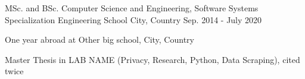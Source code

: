 


\begin{cventries}
	
	\cventry
	{MSc. and BSc. Computer Science and Engineering, Software Systems Specialization} %
	{Engineering School} %
	{City, Country} %
	{Sep. 2014 - July 2020} %
	{ %
		\begin{cvitems}
			\item {One year abroad at Other big school, City, Country}
			\item {Master Thesis in LAB NAME (Privacy, Research, Python, Data Scraping), cited twice}
		\end{cvitems}
	}
	
	
	
	
\end{cventries}